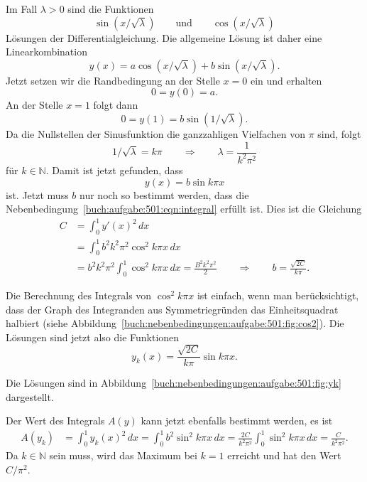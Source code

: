 \begin{loesung}
Im Fall $\lambda>0$ sind die Funktionen
\[
\sin(x/\!\sqrt{\lambda})
\qquad\text{und}\qquad
\cos(x/\!\sqrt{\lambda})
\]
Lösungen der Differentialgleichung.
Die allgemeine Lösung ist daher eine Linearkombination
\[
y(x)
=
a \cos(x/\!\sqrt{\lambda})
+
b \sin(x/\!\sqrt{\lambda}).
\]
Jetzt setzen wir die Randbedingung an der Stelle $x=0$ ein und erhalten
\[
0
=
y(0)
=
a.
\]
An der Stelle $x=1$ folgt dann
\[
0=y(1)
=
b\sin(1/\!\sqrt{\lambda}).
\]
Da die Nullstellen der Sinusfunktion die ganzzahligen Vielfachen von $\pi$
sind, folgt
\[
1/\!\sqrt{\lambda} = k\pi
\qquad\Rightarrow\qquad
\lambda = \frac{1}{k^2\pi^2}
\]
für $k\in\mathbb{N}$.
Damit ist jetzt gefunden, dass
\[
y(x) = b \sin k\pi x
\]
ist.
Jetzt muss $b$ nur noch so bestimmt werden, dass die
Nebenbedingung~\eqref{buch:aufgabe:501:eqn:integral} erfüllt ist.
Dies ist die Gleichung
\begin{align*}
C
&=
\int_0^1 y'(x)^2\,dx
\\
&=
\int_0^1 b^2 k^2\pi^2 \cos^2 k\pi x\,dx
\\
&=
b^2k^2\pi^2 \int_0^1 \cos^2 k\pi x\,dx
=
\frac{B^2k^2\pi^2}2
\qquad
\Rightarrow
\qquad
b
=
\frac{\!\sqrt{2C}}{k\pi}.
\end{align*}

Die Berechnung des Integrals von $\cos^2 k\pi x$ ist einfach, wenn man
berücksichtigt, dass der Graph des Integranden aus Symmetriegründen
das Einheitsquadrat halbiert (siehe
Abbildung~\ref{buch:nebenbedingungen:aufgabe:501:fig:cos2}).
Die Lösungen sind jetzt also die Funktionen
\[
y_k(x)
= 
\frac{\!\sqrt{2C}}{k\pi}
\sin k\pi x.
\]

Die Lösungen sind in Abbildung~\ref{buch:nebenbedingungen:aufgabe:501:fig:yk}
dargestellt.

Der Wert des Integrals $A(y)$ kann jetzt ebenfalls bestimmt werden, es
ist
\begin{align*}
A(y_k)
&=
\int_0^1 y_k(x)^2\,dx
=
\int_0^1 b^2\sin^2 k\pi x\,dx
=
\frac{2C}{k^2\pi^2} \int_0^1 \sin^2k\pi x\,dx
=
\frac{C}{k^2\pi^2}.
\end{align*}
Da $k\in\mathbb{N}$ sein muss, wird das Maximum bei $k=1$ erreicht und
hat den Wert $C/\pi^2$.
\end{loesung}
